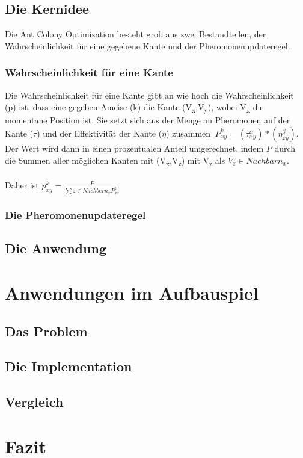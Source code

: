 \documentclass[12pt]{article}
\begin{document}
\subsection{Die Kernidee}
Die Ant Colony Optimization besteht grob aus zwei Bestandteilen, der Wahrscheinlichkeit für eine gegebene Kante und der Pheromonenupdateregel.
\subsubsection{Wahrscheinlichkeit für eine Kante}
Die Wahrscheinlichkeit für eine Kante gibt an wie hoch die Wahrscheinlichkeit (p) ist, dass eine gegeben Ameise (k) die Kante (V\textsubscript{x},V\textsubscript{y}), wobei V\textsubscript{x} die momentane Position ist. Sie setzt sich aus der Menge an Pheromonen auf der Kante ($\tau$) und der Effektivität der Kante ($\eta$) zusammen $\ P ^{ k }_{ xy }=\left(  \tau ^{ \alpha }_{ xy } \right)*\left(  \eta ^{ \beta }_{ xy } \right)$. 
Der Wert wird dann in einen prozentualen Anteil umgerechnet, indem $P$ durch die Summen aller möglichen Kanten mit (V\textsubscript{x},V\textsubscript{z}) mit V\textsubscript{z} als $V_z \in Nachbarn_{x}$.\\\\
Daher ist $p^{k}_{xy}=\frac{P}{\sum{z\in Nachbern_x}{}{P^{k }_{xz}}} $
\subsubsection{Die Pheromonenupdateregel}
\subsection{Die Anwendung}

\section{Anwendungen im Aufbauspiel}

\subsection{Das Problem}

\subsection{Die Implementation}

\subsection{Vergleich}

\section{Fazit}


\nocite{*}
\printbibliography
\end{document}
